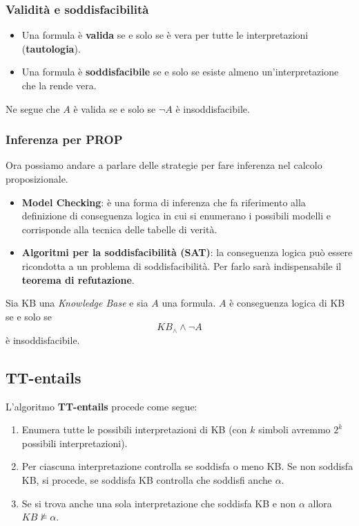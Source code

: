 \subsubsection{Validit\`a e soddisfacibilit\`a}
\begin{itemize}
	\item Una formula \`e \textbf{valida} se e solo se \`e vera per tutte le interpretazioni (\textbf{tautologia}).
	\item Una formula \`e \textbf{soddisfacibile} se e solo se esiste almeno un'interpretazione che la rende vera.
\end{itemize}
Ne segue che $A$ \`e valida se e solo se $\lnot A$ \`e insoddisfacibile.

\subsubsection{Inferenza per PROP}
Ora possiamo andare a parlare delle strategie per fare inferenza nel calcolo proposizionale.
\begin{itemize}
	\item \textbf{Model Checking}: \`e una forma di inferenza che fa riferimento alla definizione di conseguenza logica
	      in cui si enumerano i possibili modelli e corrisponde alla tecnica delle tabelle di verit\`a.
	\item \textbf{Algoritmi per la soddisfacibilit\`a (SAT)}: la conseguenza logica pu\`o essere ricondotta a un problema di
	      soddisfacibilit\`a. Per farlo sar\`a indispensabile il \textbf{teorema di refutazione}.
\end{itemize}

\begin{theorem}
	Sia KB una \emph{Knowledge Base} e sia $A$ una formula. $A$ \`e conseguenza logica di KB se e solo se
	\[ KB_\wedge \wedge \lnot A \]
	\`e insoddisfacibile.
\end{theorem}

\subsection{TT-entails}
L'algoritmo \textbf{TT-entails} procede come segue:
\begin{enumerate}
	\item Enumera tutte le possibili interpretazioni di KB (con $k$ simboli avremmo $2^k$ possibili interpretazioni).
	\item Per ciascuna interpretazione controlla se soddisfa o meno KB. Se non soddisfa KB, si procede, se soddisfa KB
	      controlla che soddisfi anche $\alpha$.
	\item Se si trova anche una sola interpretazione che soddisfa KB e non $\alpha$ allora $KB \not\models \alpha$.
\end{enumerate}

